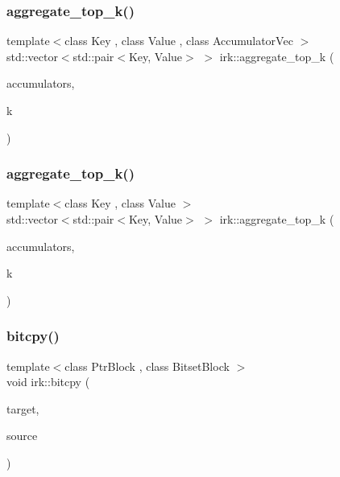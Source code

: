 \mbox{\label{namespaceirk_af5d9aefa4c5e398f324cde7c81d5e765}} 
\subsubsection{\texorpdfstring{aggregate\+\_\+top\+\_\+k()}{aggregate\_top\_k()}\hspace{0.1cm}{\footnotesize\ttfamily [1/2]}}
{\footnotesize\ttfamily template$<$class Key , class Value , class Accumulator\+Vec $>$ \\
std\+::vector$<$std\+::pair$<$Key, Value$>$ $>$ irk\+::aggregate\+\_\+top\+\_\+k (\begin{DoxyParamCaption}\item[{const Accumulator\+Vec \&}]{accumulators,  }\item[{int}]{k }\end{DoxyParamCaption})}

\mbox{\label{namespaceirk_af0421bdf64d67fbad118cec711711791}} 
\subsubsection{\texorpdfstring{aggregate\+\_\+top\+\_\+k()}{aggregate\_top\_k()}\hspace{0.1cm}{\footnotesize\ttfamily [2/2]}}
{\footnotesize\ttfamily template$<$class Key , class Value $>$ \\
std\+::vector$<$std\+::pair$<$Key, Value$>$ $>$ irk\+::aggregate\+\_\+top\+\_\+k (\begin{DoxyParamCaption}\item[{const \mbox{\hyperlink{structirk_1_1block__accumulator__vector}{block\+\_\+accumulator\+\_\+vector}}$<$ Value $>$ \&}]{accumulators,  }\item[{int}]{k }\end{DoxyParamCaption})}

\mbox{\label{namespaceirk_ae79f958d4bca4bb9e05628261f2fb725}} 
\subsubsection{\texorpdfstring{bitcpy()}{bitcpy()}\hspace{0.1cm}{\footnotesize\ttfamily [1/2]}}
{\footnotesize\ttfamily template$<$class Ptr\+Block , class Bitset\+Block $>$ \\
void irk\+::bitcpy (\begin{DoxyParamCaption}\item[{\mbox{\hyperlink{classirk_1_1bitptr}{bitptr}}$<$ Ptr\+Block $>$}]{target,  }\item[{const boost\+::dynamic\+\_\+bitset$<$ Bitset\+Block $>$ \&}]{source }\end{DoxyParamCaption})}

